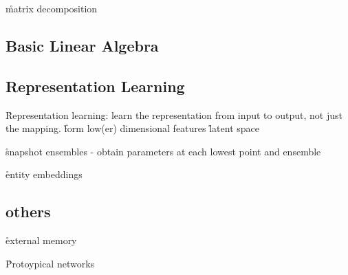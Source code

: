 \r{matrix decomposition}

\subsection{Basic Linear Algebra}


\subsection{Representation Learning}

\r{Representation learning: learn the representation from input to output, not just the mapping.}
\r{form low(er) dimensional features}
\r{latent space}


\r{snapshot ensembles \cite{huang2017snapshot} - obtain parameters at each lowest point and ensemble}


\r{entity embeddings \cite{guo2016entity}}

\subsection{others}

\r{external memory \cite{santoro2016meta, garnelo2018conditional, munkhdalai2017meta}}


\r{Protoypical networks \cite{snell2017prototypical}}

